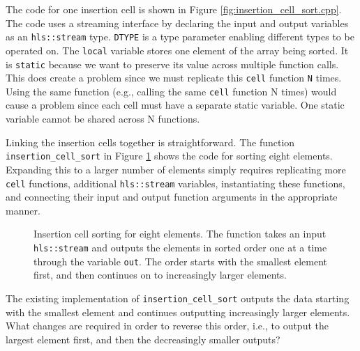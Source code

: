 The code for one insertion cell is shown in Figure \ref{fig:insertion_cell_sort.cpp}. The code uses a streaming interface by declaring the input and output variables as an \lstinline{hls::stream} type. \lstinline{DTYPE} is a type parameter enabling different types to be operated on. The \lstinline{local} variable stores one element of the array being sorted. It is \lstinline{static} because we want to preserve its value across multiple function calls. This does create a problem since we must replicate this \lstinline{cell} function \lstinline{N} times.  Using the same function (e.g., calling the same \lstinline{cell} function N times) would cause a problem since each cell must have a separate static variable.  One static variable cannot be shared across N functions.

%


Linking the insertion cells together is straightforward. The function \lstinline{insertion_cell_sort} in Figure \ref{fig:partial_insertion_cell_sort.cpp} shows the code for sorting eight elements. Expanding this to a larger number of elements simply requires replicating more \lstinline{cell} functions, additional \lstinline{hls::stream} variables, instantiating these functions, and connecting their input and output function arguments in the appropriate manner.

\begin{figure}
{\footnotesize }
\caption{  Insertion cell sorting for eight elements. The function takes an input \lstinline{hls::stream} and outputs the elements in sorted order one at a time through the variable \lstinline{out}. The order starts with the smallest element first, and then continues on to increasingly larger elements. }
\label{fig:partial_insertion_cell_sort.cpp}
\end{figure}

\begin{exercise}
The existing implementation of \lstinline{insertion_cell_sort} outputs the data starting with the smallest element and continues outputting increasingly larger elements. What changes are required in order to reverse this order, i.e., to output the largest element first, and then the decreasingly smaller outputs? 
\end{exercise}

